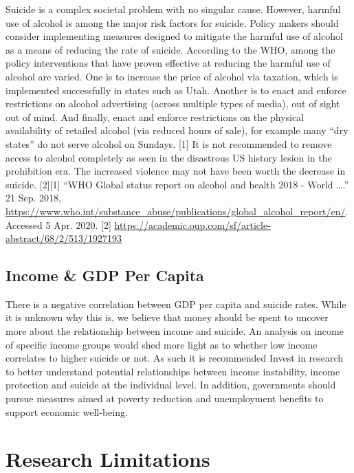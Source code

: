 \documentclass[]{article}
\begin{document}
Suicide is a complex societal problem with no singular cause. However,
harmful use of alcohol is among the major risk factors for suicide.
Policy makers should consider implementing measures designed to mitigate
the harmful use of alcohol as a means of reducing the rate of suicide.
According to the WHO, among the policy interventions that have proven
effective at reducing the harmful use of alcohol are varied. One is to
increase the price of alcohol via taxation, which is implemented
successfully in states such as Utah. Another is to enact and enforce
restrictions on alcohol advertising (across multiple types of media),
out of sight out of mind. And finally, enact and enforce restrictions on
the physical availability of retailed alcohol (via reduced hours of
sale), for example many ``dry states'' do not serve alcohol on Sundays.
{[}1{]} It is not recommended to remove access to alcohol completely as
seen in the disastrous US history lesion in the prohibition era. The
increased violence may not have been worth the decrease in suicide.
{[}2{]}{[}1{]} ``WHO \textbar{} Global status report on alcohol and
health 2018 - World \ldots{}.'' 21 Sep. 2018,
\url{https://www.who.int/substance_abuse/publications/global_alcohol_report/en/}.
Accessed 5 Apr. 2020. {[}2{]}
\url{https://academic.oup.com/sf/article-abstract/68/2/513/1927193}

\subsection{Income \& GDP Per Capita}\label{income-gdp-per-capita}

There is a negative correlation between GDP per capita and suicide
rates. While it is unknown why this is, we believe that money should be
spent to uncover more about the relationship between income and suicide.
An analysis on income of specific income groups would shed more light as
to whether low income correlates to higher suicide or not. As such it is
recommended Invest in research to better understand potential
relationships between income instability, income protection and suicide
at the individual level. In addition, governments should pursue measures
aimed at poverty reduction and unemployment benefits to support economic
well-being.

\section{Research Limitations}\label{research-limitations}
\end{document}
